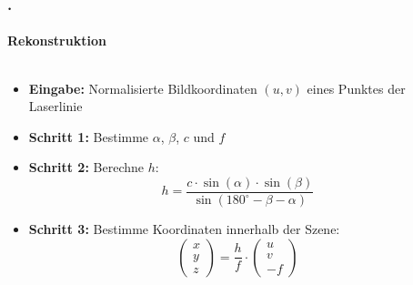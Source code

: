 \documentclass[xcolor=dvipsnames]{beamer}
\def\frametitlesec{\frametitle{\arabic{section}.\hspace{0.5ex}\insertsection}}
\def\framesubtitles#1{\framesubtitle{\hspace{3.5ex}#1}}
\begin{document}
\begin{frame}
	\frametitlesec
	\framesubtitles{Rekonstruktion}

	\begin{columns}
		\small
		\begin{column}{.61\linewidth}
			\begin{itemize}
				\item \textbf{Eingabe:} Normalisierte Bildkoordinaten $(u,v)$ eines Punktes der Laserlinie
				\item \textbf{Schritt 1:} Bestimme $\alpha$, $\beta$, $c$ und $f$
				\item \textbf{Schritt 2:} Berechne $h$:
				\[h = \frac{c \cdot \sin(\alpha) \cdot \sin(\beta)}{\sin(180^\circ - \beta - \alpha)}\]
				\item \textbf{Schritt 3:} Bestimme Koordinaten innerhalb der Szene:
				\[\begin{pmatrix}x\\y\\z\end{pmatrix} = \frac{h}{f} \cdot
				\begin{pmatrix}u\\v\\-f\end{pmatrix}\]
			\end{itemize}
		\end{column}
		\begin{column}{.39\linewidth}
			\hfill{}

\end{column}
\end{columns}
\end{frame}
\end{document}
